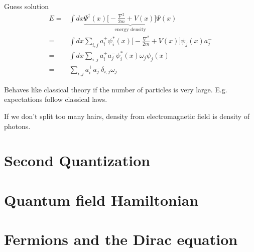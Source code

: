 \documentclass[]{article}
\begin{document}
Guess solution
\begin{align*}
E=&\int dx \underbrace{\Psi^\dagger(x) \big[-\frac{\nabla^2}{2m} + V(x)\big] \Psi(x)}_\text{energy density} \\
=& \int dx \sum_{i,j}a^+_i\psi_i^*(x)\big[-\frac{\nabla^2}{2m} + V(x)\big]\psi_j(x)a^-_j\\
=& \int dx \sum_{i,j} a^+_i a^-_j \psi_i^*(x) \omega_j \psi_j(x)\\
=&  \sum_{i,j} a^+_i a^-_j \delta_{i,j} \omega_j
\end{align*}

Behaves like classical theory if the number of particles is very large. E.g. expectations follow classical laws.

If we don't split too many hairs, density from electromagnetic field is density of photons.

\section {Second Quantization}

\section{Quantum field Hamiltonian}

\section{Fermions and the Dirac equation}
\end{document}
